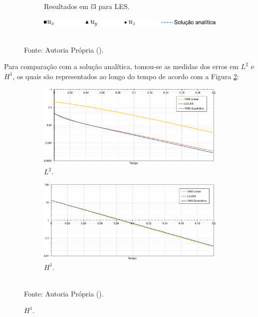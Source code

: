 \begin{figure}[h]
\begin{subfigure}{0.42\textwidth}
    \caption{Resultados em $l3$ para LES.}
    \end{subfigure}
    \begin{subfigure}{0.42\textwidth}
    \includegraphics[width=\linewidth]{Figuras/taylor-green/legenda.pdf}
    \end{subfigure}
    \\Fonte: Autoria Própria (\the\year).
    \label{fig:TGV-results}
\end{figure}

Para comparação com a solução analítica, tomou-se as medidas dos erros em $L^2$ e $H^1$, os quais são representados ao longo do tempo de acordo com a Figura \ref{fig:TGV-L2H1}:

\begin{figure}[h]
    \centering
    \caption{Medidas ao longo do tempo de:}
    \begin{subfigure}{\textwidth}
    \includegraphics[width=\linewidth]{Figuras/taylor-green/L2.pdf}
    \caption{$L^2$.}
    \end{subfigure}
    \begin{subfigure}{\textwidth}
    \includegraphics[width=\linewidth]{Figuras/taylor-green/H1.pdf}
    \caption{$H^1$.}
    \end{subfigure}
    \\Fonte: Autoria Própria (\the\year).
    \label{fig:TGV-L2H1}
\end{figure}

